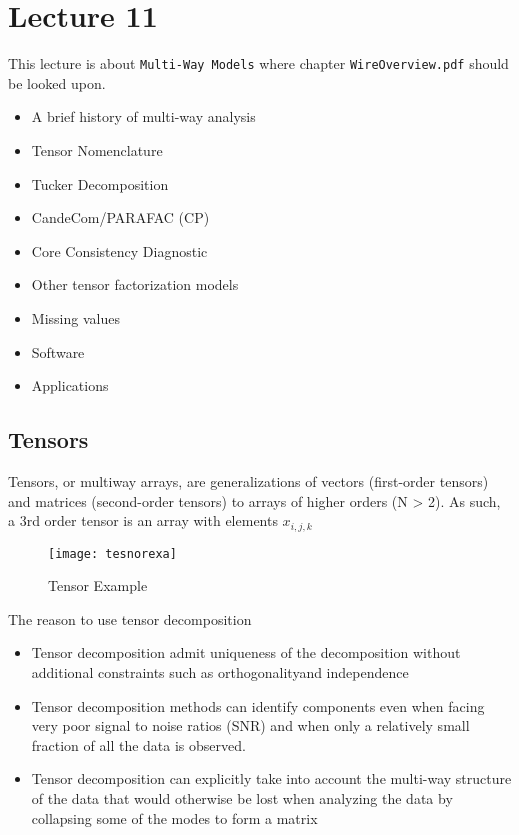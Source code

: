 \chapter{Lecture 11}

This lecture is about \texttt{Multi-Way Models} where chapter \texttt{WireOverview.pdf} should be looked upon.

\begin{itemize}
  \item A brief history of multi-way analysis
  \item Tensor Nomenclature
  \item Tucker Decomposition
  \item CandeCom/PARAFAC (CP)
  \item Core Consistency Diagnostic
  \item Other tensor factorization models
  \item Missing values
  \item Software
  \item Applications
\end{itemize}

\section{Tensors}

Tensors, or multiway arrays, are generalizations of vectors (first-order tensors) and matrices (second-order tensors) to arrays of higher orders (N > 2). As such, a 3rd order tensor is an array with elements $x_{i,j,k} $

\begin{figure}[H]
  \centering
  \texttt{[image: tesnorexa]}
  \caption{Tensor Example}\label{fig:tesnorexa}
\end{figure}

The reason to use tensor decomposition

\begin{itemize}
  \item Tensor decomposition admit uniqueness of the decomposition without additional constraints such as orthogonalityand independence
  \item Tensor decomposition methods can identify components even when facing very poor signal to noise ratios (SNR) and when only a relatively small fraction of all the data is observed.
  \item Tensor decomposition can explicitly take into account the multi-way structure of the data that would otherwise be lost when analyzing the data by collapsing some of the modes to form a matrix
\end{itemize}

